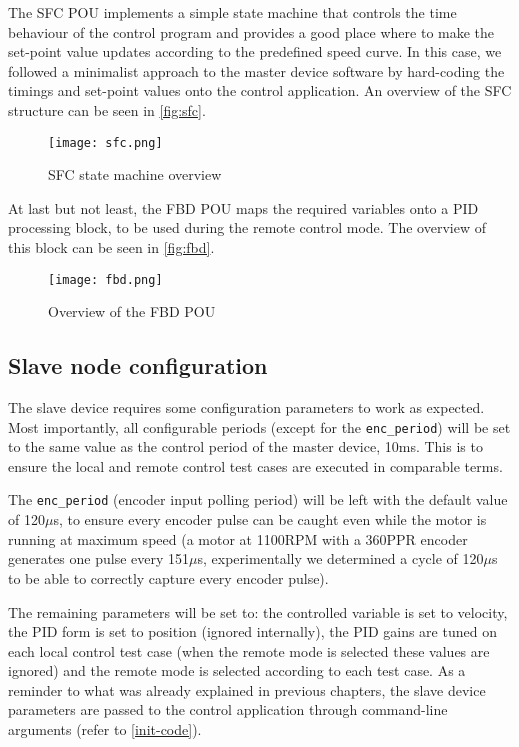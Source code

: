 The SFC POU implements a simple state machine that controls the time behaviour of the control program and provides a good place where to make the set-point value updates according to the predefined speed curve.
In this case, we followed a minimalist approach to the master device software by hard-coding the timings and set-point values onto the control application.
An overview of the SFC structure can be seen in \autoref{fig:sfc}.

\begin{figure}[htp]
	\centering
	\texttt{[image: sfc.png]}
	\caption{SFC state machine overview}
	\label{fig:sfc}
\end{figure}

At last but not least, the FBD POU maps the required variables onto a PID processing block, to be used during the remote control mode.
The overview of this block can be seen in \autoref{fig:fbd}.

\begin{figure}[htp]
	\centering
	\texttt{[image: fbd.png]}
	\caption{Overview of the FBD POU}
	\label{fig:fbd}
\end{figure}

\subsection{Slave node configuration}
The slave device requires some configuration parameters to work as expected.
Most importantly, all configurable periods (except for the \verb|enc_period|) will be set to the same value as the control period of the master device, 10ms.
This is to ensure the local and remote control test cases are executed in comparable terms.

The \verb|enc_period| (encoder input polling period) will be left with the default value of 120$\mu$s, to ensure every encoder pulse can be caught even while the motor is running at maximum speed (a motor at 1100RPM with a 360PPR encoder generates one pulse every 151$\mu$s, experimentally we determined a cycle of 120$\mu$s to be able to correctly capture every encoder pulse).

The remaining parameters will be set to: the controlled variable is set to velocity, the PID form is set to position (ignored internally), the PID gains are tuned on each local control test case (when the remote mode is selected these values are ignored) and the remote mode is selected according to each test case.
As a reminder to what was already explained in previous chapters, the slave device parameters are passed to the control application through command-line arguments (refer to \autoref{init-code}).

